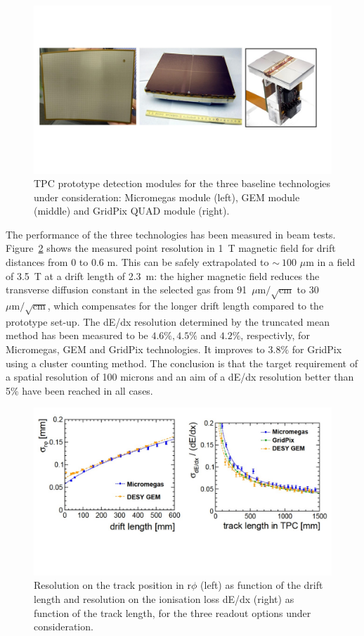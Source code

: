 \begin{figure}[t!]
\centering
\includegraphics[width=1.0\hsize]{Detector/fig/TPC_prototypes.jpg}
\caption{TPC prototype detection modules for the three baseline technologies under consideration: Micromegas module (left), GEM module (middle) and GridPix QUAD module (right).}
\label{fig:det:TPC_prototypes}
\end{figure}

The performance of the three technologies has been measured in beam tests. Figure~\ref{fig:det:TPC_performances} shows the measured point resolution in 1~T magnetic field for drift distances from 0 to 0.6 m. This can be safely extrapolated to $\sim~100$ $\mu$m in a field of 3.5~T at a drift length of 2.3~m: the higher magnetic field reduces the transverse diffusion constant in the selected gas from 91~$\mu \mathrm{m} / \sqrt{\mathrm{cm}}$ to 30 $\mu \mathrm{m} / \sqrt{\mathrm{cm}}$, which compensates for the longer drift length compared to the prototype set-up. The dE/dx resolution determined by the truncated mean method has been measured to be $4.6\%, 4.5\%$ and $4.2\%$, respectivly, for Micromegas, GEM and GridPix technologies. It improves to $3.8\%$ for GridPix using a cluster counting method. The conclusion is that the target requirement of a spatial resolution of 100 microns and an aim of a dE/dx resolution better than 5\% have been reached in all cases.   
\begin{figure}[t!]
\centering
\includegraphics[width=1.0\hsize]{Detector/fig/TPC_performances.jpg}
\caption{Resolution on the track position in r$\phi$ (left) as function of the drift length and resolution on the ionisation loss dE/dx (right) as function of the track length, for the three readout options under consideration.}
\label{fig:det:TPC_performances}
\end{figure}


